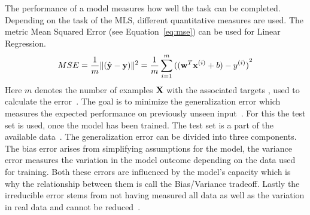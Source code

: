The performance of a model measures how well the task can be completed.
Depending on the task of the \ac{MLS}, different quantitative measures are used.
The metric Mean Squared Error (see Equation~\ref{eq:mse}) can be used for Linear Regression.
\begin{equation}\label{eq:mse}
    MSE =\frac{1}{m}\lVert{(\hat{\textbf{y}} - \textbf{y})}\rVert^2
        =\frac{1}{m}\sum_{i=1}^m {((\textbf{w}^T \textbf{x}^{(i)} + b) - y^{(i)})}^2
\end{equation}
Here $m$ denotes the number of examples $\textbf{X}$ with the associated targets \y, used to calculate
the error~\citep{geron_hands-machine_2017,goodfellow_deep_2016}.
The goal is to minimize the generalization error which measures the expected performance on
previously unseen input~\citep{geron_hands-machine_2017}.
For this the test set is used, once the model has been trained.
The test set is a part of the available data~\citep{geron_hands-machine_2017, goodfellow_deep_2016}.
The generalization error can be divided into three components.
The bias error arises from simplifying assumptions for the model, the variance error measures the
variation in the model outcome depending on the data used for training.
Both these errors are influenced by the model's capacity which is why the relationship between them
is call the Bias/Variance tradeoff.
Lastly the irreducible error stems from not having measured all data as well as the variation
in real data and cannot be
reduced~\citep{ashmore_assuring_2021, james_introduction_2013,geron_hands-machine_2017}.

